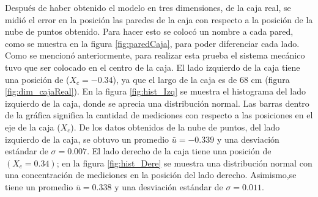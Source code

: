 

Después de haber obtenido el modelo en tres dimensiones, de la caja real, se midió 
el error en la posición las paredes de la caja con respecto a la posición de la nube 
de puntos obtenido. Para hacer esto se colocó un nombre a cada pared, como se muestra en 
la figura \ref{fig:paredCaja}, para poder diferenciar cada lado. Como se mencionó 
anteriormente, para realizar esta prueba el sistema mecánico tuvo que ser colocado en 
el centro de la caja. El lado izquierdo de la caja tiene una posición de ($X_{c} = 
-0.34$), ya que el largo de la caja es de 68 cm (figura \ref{fig:dim_cajaReal}). En 
la figura \ref{fig:hist_Izq} se muestra el histograma del lado izquierdo de la caja, 
donde se aprecia una distribución normal. Las barras dentro de la gráfica significa la
cantidad de mediciones con respecto a las posiciones en el eje de la caja ($X_{c}$). De los 
datos obtenidos de la nube de puntos, del lado izquierdo de la caja, se obtuvo un 
promedio $\bar{u} = -0.339$ y una desviación estándar de $\sigma = 0.007$. El lado 
derecho de la caja tiene una posición de $(X_{c} = 0.34)$; en la figura \ref{fig:hist_Dere} 
se muestra una distribución normal con una concentración de mediciones en la posición del 
lado derecho. Asimismo,se tiene un promedio $\bar{u} = 0.338$ y una desviación estándar 
de $\sigma = 0.011$.  

